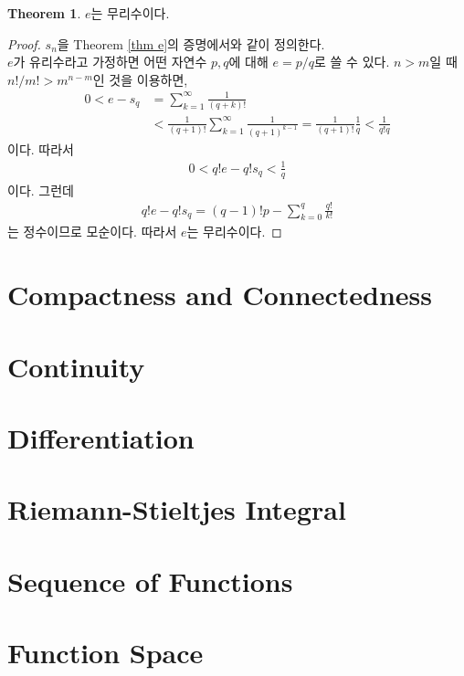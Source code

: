 \documentclass[12pt]{article}
\theoremstyle{definition}
\newtheorem{thm}{Theorem}[section]
\begin{document}
\begin{thm}
	\(e\)는 무리수이다.
\end{thm}
\begin{proof}
	\(s_n\)을 Theorem \ref{thm e}의 증명에서와 같이 정의한다.\\
	\(e\)가 유리수라고 가정하면 어떤 자연수 \(p, q\)에 대해 \(e = p/q\)로 쓸 수 있다. \(n > m\)일 때 \(n!/m! > m^{n-m}\)인 것을 이용하면,
	\begin{align*}
		0 < e - s_q &= \sum_{k=1}^\infty \frac{1}{(q+k)!}\\
		&< \frac{1}{(q+1)!}\sum_{k=1}^\infty \frac{1}{(q+1)^{k-1}} = \frac{1}{(q+1)!} \frac{1}{q} < \frac{1}{q!q}
	\end{align*}
	이다. 따라서
	\begin{align*}
		0 < q!e - q!s_q < \frac{1}{q}
	\end{align*}
	이다. 그런데
	\begin{align*}
		q!e - q!s_q = (q-1)!p - \sum_{k=0}^q \frac{q!}{k!}
	\end{align*}
	는 정수이므로 모순이다. 따라서 \(e\)는 무리수이다.
\end{proof}

\newpage

\section{Compactness and Connectedness} \label{sec cpt}

\section{Continuity}

\section{Differentiation}

\section{Riemann-Stieltjes Integral}

\section{Sequence of Functions}

\section{Function Space}
\end{document}
